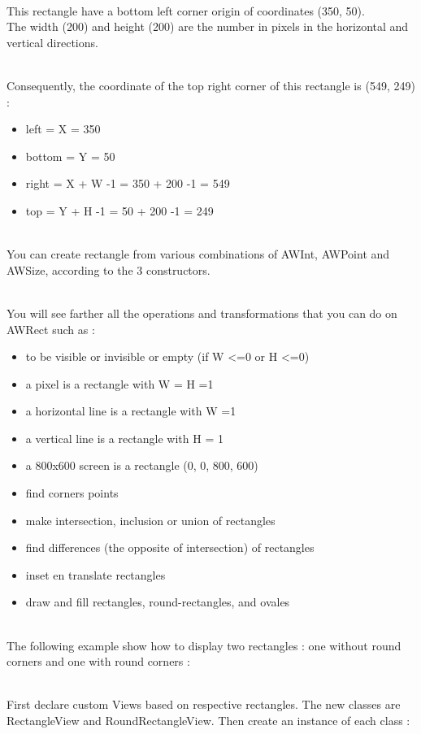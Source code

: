 \documentclass[a4paper,11pt]{extarticle}
\begin{document}
~\\ This rectangle have a bottom left corner origin of coordinates (350, 50).
~\\ The width (200) and height (200) are the number in pixels in the horizontal and vertical directions.

~\\ Consequently, the coordinate of the top right corner of this rectangle is (549, 249) :
\begin{itemize}
\item left = X = 350
\item bottom = Y = 50
\item right = X + W -1 = 350 + 200 -1 = 549
\item top = Y + H -1 = 50 + 200 -1 = 249
\end{itemize}


~\\ You can create rectangle from various combinations of AWInt, AWPoint and AWSize, according to the 3 constructors. 

~\\ You will see farther all the operations and transformations that you can do on AWRect such as :
\begin{itemize}
\item to be visible or invisible or empty (if W <=0 or H <=0)
\item a pixel is a rectangle with W = H =1
\item a horizontal line is a rectangle with W =1
\item a vertical line is a rectangle with H = 1
\item a 800x600 screen is a rectangle (0, 0, 800, 600)
\item find corners points
\item make intersection, inclusion or union of rectangles
\item find differences (the opposite of intersection) of rectangles
\item inset en translate rectangles
\item draw and fill rectangles, round-rectangles, and ovales
\end{itemize}

~\\The following example show how to display two rectangles : one without round corners and one with round corners :

~\\ First declare custom Views based on respective rectangles. The new classes are RectangleView and RoundRectangleView. Then create an instance of each class :
\end{document}
